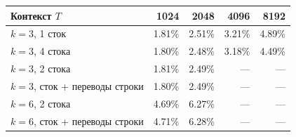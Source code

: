 \begin{tabular}{lrrrr}
\toprule
Контекст $T$ & 1024 & 2048 & 4096 & 8192 \\
\midrule
$k=3$, 1 сток & 1.81\% & 2.51\% & 3.21\% & 4.89\% \\
$k=3$, 4 стока & 1.80\% & 2.48\% & 3.18\% & 4.49\% \\
\midrule
$k=3$, 2 стока & 1.81\% & 2.49\% & — & — \\
$k=3$, сток + переводы строки & 1.80\% & 2.49\% & — & — \\
$k=6$, 2 стока & 4.69\% & 6.27\% & — & — \\
$k=6$, сток + переводы строки & 4.71\% & 6.28\% & — & — \\
\bottomrule
\end{tabular}

